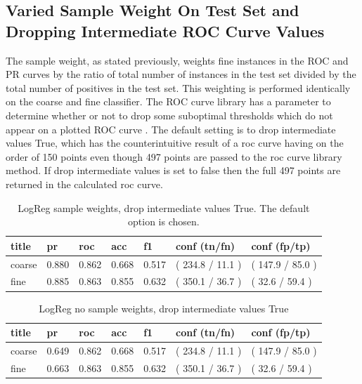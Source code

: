 \documentclass[ms]{nuthesis}
\begin{document}
\subsection{Varied Sample Weight On Test Set and Dropping Intermediate ROC Curve Values}
\par The sample weight, as stated previously, weights fine instances in the ROC and PR curves by the ratio of
total number of instances in the test set divided by the total number of positives in the test set. This
weighting is performed identically on the coarse and fine classifier. The ROC curve library has a parameter to determine
whether or not to drop some suboptimal thresholds which do not appear on a plotted ROC curve \cite{scikit-learn}. The
default setting is to drop intermediate values True, which has the counterintuitive result of a roc curve having on the order of
150 points even though 497 points are passed to the roc curve library method. If drop intermediate values is set to false
then the full 497 points are returned in the calculated roc curve.



\FloatBarrier
\begin{table}[H]
\centering
\begin{tabular}{|l||l||l||l||l||l||l|}\toprule
title & pr & roc & acc & f1 & conf (tn/fn) & conf (fp/tp) \\ \midrule
coarse & 0.880 & 0.862 & 0.668 & 0.517 & ( 234.8 / 11.1 ) & ( 147.9 / 85.0 ) \\
fine & 0.885 & 0.863 & 0.855 & 0.632 & ( 350.1 / 36.7 ) & ( 32.6 / 59.4 ) \\ \bottomrule
\end{tabular}
\caption{LogReg sample weights, drop intermediate values True. The default option is chosen.}
\label{tab:LogRegDefSWDropFalse}
\end{table}
\FloatBarrier


\FloatBarrier
\begin{table}[h]
\centering
\begin{tabular}{|l||l||l||l||l||l||l|}\toprule
title & pr & roc & acc & f1 & conf (tn/fn) & conf (fp/tp) \\ \midrule
coarse & 0.649 & 0.862 & 0.668 & 0.517 & ( 234.8 / 11.1 ) & ( 147.9 / 85.0 ) \\
fine & 0.663 & 0.863 & 0.855 & 0.632 & ( 350.1 / 36.7 ) & ( 32.6 / 59.4 ) \\ \bottomrule
\end{tabular}
\caption{LogReg no sample weights, drop intermediate values True}
\label{tab:LogReg-NoSW}
\end{table}
\FloatBarrier
\end{document}
